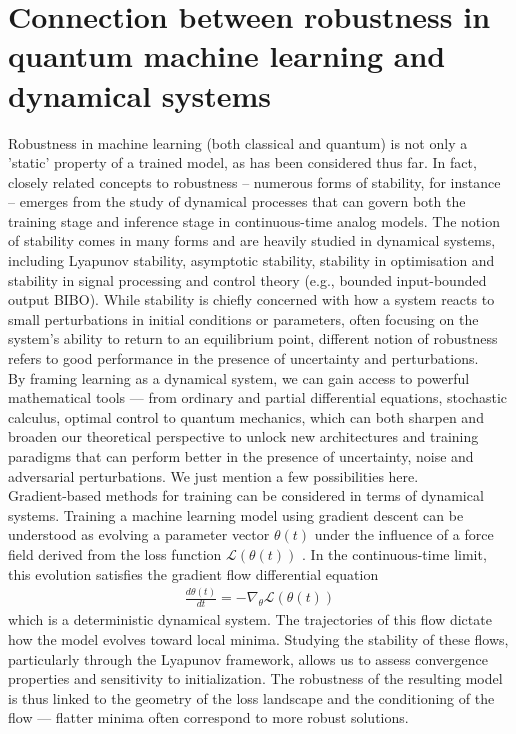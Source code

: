 \documentclass[onecolumn,prx, superscriptaddress,longbibliography,margin=1mm 11pt]{revtex4-2}
\begin{document}
\section{Connection between robustness in quantum machine learning and dynamical systems}
Robustness in machine learning (both classical and quantum) is not only a 'static' property of a trained model, as has been considered thus far. In fact, closely related concepts to robustness -- numerous forms of stability, for instance -- emerges from the study of dynamical processes that can govern both the training stage and inference stage in continuous-time analog models. The notion of stability comes in many forms and are heavily studied in dynamical systems, including Lyapunov stability, asymptotic stability, stability in optimisation and stability in signal processing and control theory (e.g., bounded input-bounded output BIBO). While stability is chiefly concerned with how a system reacts to small perturbations in initial conditions or
parameters, often focusing on the system's ability to return to an equilibrium point, different notion of robustness refers to good performance in the presence of uncertainty and perturbations.\\

By framing learning as a dynamical system, we can gain access to powerful mathematical tools — from ordinary and partial differential equations, stochastic calculus, optimal control to quantum mechanics, which can both sharpen and broaden our theoretical perspective to unlock new architectures and training paradigms that can perform better in the presence of uncertainty, noise and adversarial perturbations. We just mention a few possibilities here. \\

Gradient-based methods for training can be considered in terms of dynamical systems. Training a machine learning model using gradient descent can be understood as evolving a parameter vector $\theta(t)$ under the influence of a force field derived from the loss function 
$\mathcal{L}({\theta}(t))$ . In the continuous-time limit, this evolution satisfies the gradient flow differential equation
\begin{align}
    \frac{d \theta(t)}{dt}=-\nabla_{\theta}\mathcal{L}(\theta(t))
\end{align}
which is a deterministic dynamical system. The trajectories of this flow dictate how the model evolves toward local minima. Studying the stability of these flows, particularly through the Lyapunov framework, allows us to assess convergence properties and sensitivity to initialization. The robustness of the resulting model is thus linked to the geometry of the loss landscape and the conditioning of the flow — flatter minima often correspond to more robust solutions. \\
\end{document}
